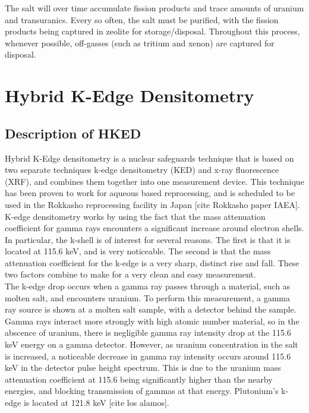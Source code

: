 The salt will over time accumulate fission products and trace amounts of uranium and transuranics. Every so often, the salt must be purified, with the fission products being captured in zeolite for storage/disposal. Throughout this process, whenever possible, off-gasses (such as tritium and xenon) are captured for disposal. \\

\section{Hybrid K-Edge Densitometry}

\subsection{Description of HKED}

Hybrid K-Edge densitometry is a nuclear safeguards technique that is based on two separate techniques k-edge densitometry (KED) and x-ray fluorescence (XRF), and combines them together into one measurement device. This technique has been proven to work for aqueous based reprocessing, and is scheduled to be used in the Rokkasho reprocessing facility in Japan [cite Rokkasho paper IAEA]. \\

K-edge densitometry works by using the fact that the mass attenuation coefficient for gamma rays encounters a significant increase around electron shells. In particular, the k-shell is of interest for several reasons. The first is that it is located at 115.6 keV, and is very noticeable. The second is that the mass attenuation coefficient for the k-edge is a very sharp, distinct rise and fall. These two factors combine to make for a very clean and easy measurement. \\

The k-edge drop occurs when a gamma ray passes through a material, such as molten salt, and encounters uranium. To perform this measurement, a gamma ray source is shown at a molten salt sample, with a detector behind the sample. Gamma rays interact more strongly with high atomic number material, so in the abscence of uranium, there is negligible gamma ray intensity drop at the 115.6 keV energy on a gamma detector. However, as uranium concentration in the salt is increased, a noticeable decrease in gamma ray intensity occurs around 115.6 keV in the detector pulse height spectrum. This is due to the uranium mass attenuation coefficient at 115.6 being significantly higher than the nearby energies, and blocking transmission of gammas at that energy. Plutonium's k-edge is located at 121.8 keV [cite los alamos].\\

